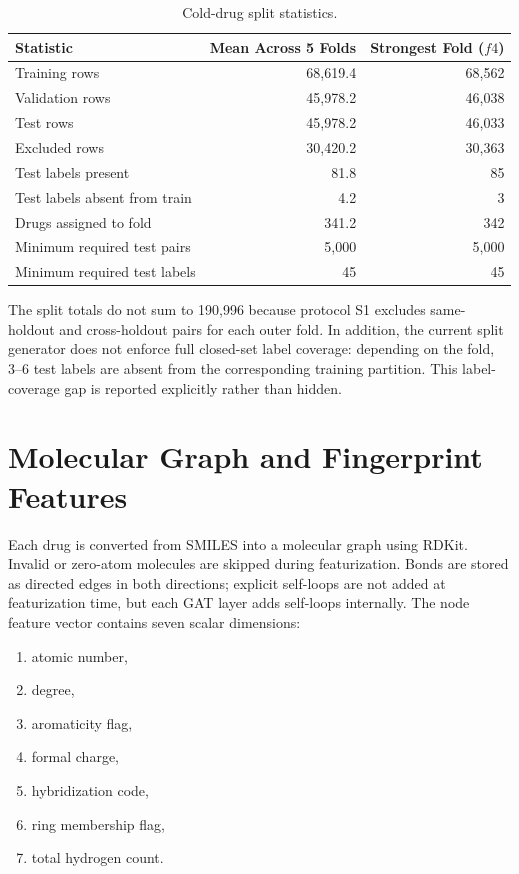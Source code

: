 \documentclass[12pt,a4paper]{report}
\begin{document}
\begin{table}[H]
\centering
\caption{Cold-drug split statistics.}
\label{tab:split_stats}
\begin{tabular}{lrr}
\toprule
Statistic & Mean Across 5 Folds & Strongest Fold (\(f4\)) \\
\midrule
Training rows & 68{,}619.4 & 68{,}562 \\
Validation rows & 45{,}978.2 & 46{,}038 \\
Test rows & 45{,}978.2 & 46{,}033 \\
Excluded rows & 30{,}420.2 & 30{,}363 \\
Test labels present & 81.8 & 85 \\
Test labels absent from train & 4.2 & 3 \\
Drugs assigned to fold & 341.2 & 342 \\
Minimum required test pairs & 5{,}000 & 5{,}000 \\
Minimum required test labels & 45 & 45 \\
\bottomrule
\end{tabular}
\end{table}

The split totals do not sum to 190{,}996 because protocol S1 excludes same-holdout and cross-holdout pairs for each outer fold. In addition, the current split generator does not enforce full closed-set label coverage: depending on the fold, 3--6 test labels are absent from the corresponding training partition. This label-coverage gap is reported explicitly rather than hidden.

\section{Molecular Graph and Fingerprint Features}
Each drug is converted from SMILES into a molecular graph using RDKit. Invalid or zero-atom molecules are skipped during featurization. Bonds are stored as directed edges in both directions; explicit self-loops are not added at featurization time, but each GAT layer adds self-loops internally. The node feature vector contains seven scalar dimensions:
\begin{enumerate}
    \item atomic number,
    \item degree,
    \item aromaticity flag,
    \item formal charge,
    \item hybridization code,
    \item ring membership flag,
    \item total hydrogen count.
\end{enumerate}
\end{document}
